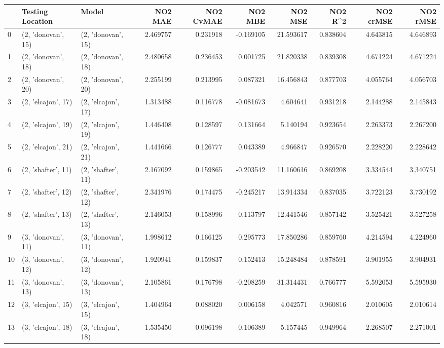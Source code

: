 \begin{tabular}{lllrrrrrrr}
\toprule
{} &    Testing Location &               Model &   NO2 MAE &  NO2 CvMAE &   NO2 MBE &    NO2 MSE &   NO2 R\textasciicircum2 &  NO2 crMSE &  NO2 rMSE \\
\midrule
0  &  (2, 'donovan', 15) &  (2, 'donovan', 15) &  2.469757 &   0.231918 & -0.169105 &  21.593617 &  0.838604 &   4.643815 &  4.646893 \\
1  &  (2, 'donovan', 18) &  (2, 'donovan', 18) &  2.480658 &   0.236453 &  0.001725 &  21.820338 &  0.839308 &   4.671224 &  4.671224 \\
2  &  (2, 'donovan', 20) &  (2, 'donovan', 20) &  2.255199 &   0.213995 &  0.087321 &  16.456843 &  0.877703 &   4.055764 &  4.056703 \\
3  &  (2, 'elcajon', 17) &  (2, 'elcajon', 17) &  1.313488 &   0.116778 & -0.081673 &   4.604641 &  0.931218 &   2.144288 &  2.145843 \\
4  &  (2, 'elcajon', 19) &  (2, 'elcajon', 19) &  1.446408 &   0.128597 &  0.131664 &   5.140194 &  0.923654 &   2.263373 &  2.267200 \\
5  &  (2, 'elcajon', 21) &  (2, 'elcajon', 21) &  1.441666 &   0.126777 &  0.043389 &   4.966847 &  0.926570 &   2.228220 &  2.228642 \\
6  &  (2, 'shafter', 11) &  (2, 'shafter', 11) &  2.167092 &   0.159865 & -0.203542 &  11.160616 &  0.869208 &   3.334544 &  3.340751 \\
7  &  (2, 'shafter', 12) &  (2, 'shafter', 12) &  2.341976 &   0.174475 & -0.245217 &  13.914334 &  0.837035 &   3.722123 &  3.730192 \\
8  &  (2, 'shafter', 13) &  (2, 'shafter', 13) &  2.146053 &   0.158996 &  0.113797 &  12.441546 &  0.857142 &   3.525421 &  3.527258 \\
9  &  (3, 'donovan', 11) &  (3, 'donovan', 11) &  1.998612 &   0.166125 &  0.295773 &  17.850286 &  0.859760 &   4.214594 &  4.224960 \\
10 &  (3, 'donovan', 12) &  (3, 'donovan', 12) &  1.920941 &   0.159837 &  0.152413 &  15.248484 &  0.878591 &   3.901955 &  3.904931 \\
11 &  (3, 'donovan', 13) &  (3, 'donovan', 13) &  2.105861 &   0.176798 & -0.208259 &  31.314431 &  0.766777 &   5.592053 &  5.595930 \\
12 &  (3, 'elcajon', 15) &  (3, 'elcajon', 15) &  1.404964 &   0.088020 &  0.006158 &   4.042571 &  0.960816 &   2.010605 &  2.010614 \\
13 &  (3, 'elcajon', 18) &  (3, 'elcajon', 18) &  1.535450 &   0.096198 &  0.106389 &   5.157445 &  0.949964 &   2.268507 &  2.271001 \\

\end{tabular}
